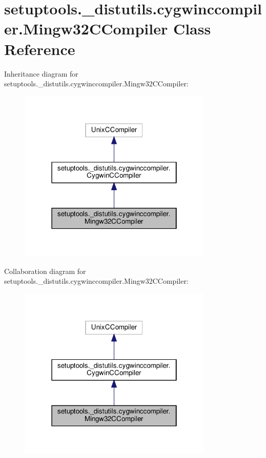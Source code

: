 \hypertarget{classsetuptools_1_1__distutils_1_1cygwinccompiler_1_1Mingw32CCompiler}{}\section{setuptools.\+\_\+distutils.\+cygwinccompiler.\+Mingw32\+C\+Compiler Class Reference}
\label{classsetuptools_1_1__distutils_1_1cygwinccompiler_1_1Mingw32CCompiler}


Inheritance diagram for setuptools.\+\_\+distutils.\+cygwinccompiler.\+Mingw32\+C\+Compiler\+:
\nopagebreak
\begin{figure}[H]
\begin{center}
\leavevmode
\includegraphics[width=262pt]{classsetuptools_1_1__distutils_1_1cygwinccompiler_1_1Mingw32CCompiler__inherit__graph}
\end{center}
\end{figure}


Collaboration diagram for setuptools.\+\_\+distutils.\+cygwinccompiler.\+Mingw32\+C\+Compiler\+:
\nopagebreak
\begin{figure}[H]
\begin{center}
\leavevmode
\includegraphics[width=262pt]{classsetuptools_1_1__distutils_1_1cygwinccompiler_1_1Mingw32CCompiler__coll__graph}
\end{center}
\end{figure}

